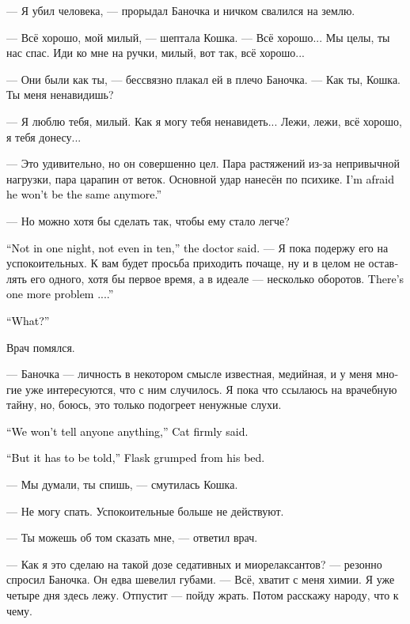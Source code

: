 \documentclass[a4paper,12pt,fleqn]{book}\usepackage{cooltooltips}\usepackage{polyglossia}\setdefaultlanguage[babelshorthands=true]{russian}\setotherlanguage{english}\defaultfontfeatures{Ligatures=TeX,Mapping=tex-text} \usepackage{xcolor}\definecolor{lightgray}{HTML}{bbbbbb}\color{lightgray}\newcommand{\ml}[3]{\textenglish{\textcolor{black}{#3}}}
\newcommand{\asterism}{\vspace{1em}{\centering\Large\bfseries$\ast~\ast~\ast$\par}\vspace{1em}}
\begin{document}
{--- Я убил человека, --- прорыдал Баночка и ничком свалился на землю.

--- Всё хорошо, мой милый, --- шептала Кошка.
--- Всё хорошо...
Мы целы, ты нас спас.
Иди ко мне на ручки, милый, вот так, всё хорошо...

--- Они были как ты, --- бессвязно плакал ей в плечо Баночка.
--- Как ты, Кошка.
Ты меня ненавидишь?

--- Я люблю тебя, милый.
Как я могу тебя ненавидеть...
Лежи, лежи, всё хорошо, я тебя донесу...

\asterism

--- Это удивительно, но он совершенно цел.
Пара растяжений из-за непривычной нагрузки, пара царапин от веток.
Основной удар нанесён по психике.
\ml{$0$}
{Я боюсь, что прежним он уже не будет.}
{I'm afraid he won't be the same anymore.''}

--- Но можно хотя бы сделать так, чтобы ему стало легче?

\ml{$0$}
{--- Не за одну ночь и даже не за десять, --- сказал врач.}
{``Not in one night, not even in ten,'' the doctor said.}
--- Я пока подержу его на успокоительных.
К вам будет просьба приходить почаще, ну и в целом не оставлять его одного, хотя бы первое время, а в идеале --- несколько оборотов.
\ml{$0$}
{Есть ещё одна проблема...}
{There's one more problem ....''}

\ml{$0$}
{--- Какая?}
{``What?''}

Врач помялся.

--- Баночка --- личность в некотором смысле известная, медийная, и у меня многие уже интересуются, что с ним случилось.
Я пока что ссылаюсь на врачебную тайну, но, боюсь, это только подогреет ненужные слухи.

\ml{$0$}
{--- Мы никому ничего не рассказываем, --- твёрдо сказала Кошка.}
{``We won't tell anyone anything,'' Cat firmly said.}

\ml{$0$}
{--- А рассказать-то надо, --- буркнул Баночка со своей постели.}
{``But it has to be told,'' Flask grumped from his bed.}

--- Мы думали, ты спишь, --- смутилась Кошка.

--- Не могу спать.
Успокоительные больше не действуют.

--- Ты можешь об том сказать мне, --- ответил врач.

--- Как я это сделаю на такой дозе седативных и миорелаксантов? --- резонно спросил Баночка.
Он едва шевелил губами.
--- Всё, хватит с меня химии.
Я уже четыре дня здесь лежу.
Отпустит --- пойду жрать.
Потом расскажу народу, что к чему.

}
\end{document}
